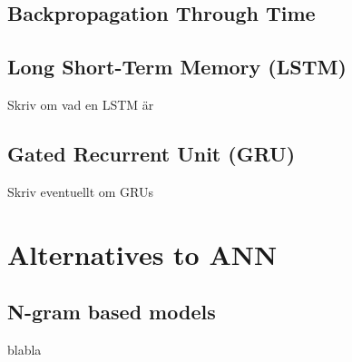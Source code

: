 \subsection{Backpropagation Through Time}

\subsection{Long Short-Term Memory (LSTM)}
Skriv om vad en LSTM är \parencite{LSTMdefined}

\subsection{Gated Recurrent Unit (GRU)}
Skriv eventuellt om GRUs

\section{Alternatives to ANN}
\subsection{N-gram based models}
blabla
